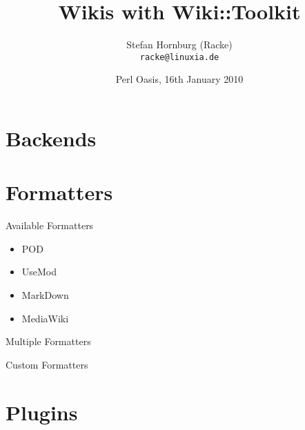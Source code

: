 \documentclass{beamer}
\title{Wikis with Wiki::Toolkit}
\author[racke]{Stefan Hornburg (Racke)\\ \texttt{racke@linuxia.de}}
\date[OPW2010]{Perl Oasis, 16th January 2010}
\begin{document}
\begin{frame}
  \titlepage
\end{frame}

\section[Outline]{}
\frame{\tableofcontents}

\section{Backends}

\section{Formatters}

\begin{frame}{Available Formatters}
 \begin{itemize}
  \item<1-> POD
  \item<2-> UseMod
  \item<3-> MarkDown
  \item<4-> MediaWiki
  \end{itemize}
\end{frame}

\begin{frame}{Multiple Formatters}
\end{frame}

\begin{frame}{Custom Formatters}
\end{frame}

\section{Plugins}
\end{document}
